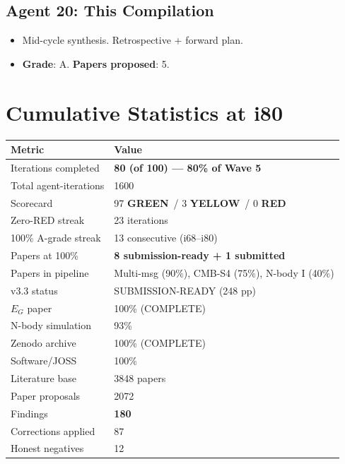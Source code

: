 \documentclass[11pt,a4paper]{article}
\newcommand{\GREEN}{\textcolor{dfdgreen}{\textbf{GREEN}}}
\newcommand{\YELLOW}{\textcolor{dfdyellow}{\textbf{YELLOW}}}
\newcommand{\RED}{\textcolor{dfdred}{\textbf{RED}}}
\begin{document}
\subsection{Agent 20: This Compilation}
\begin{itemize}[nosep]
\item Mid-cycle synthesis. Retrospective + forward plan.
\item \textbf{Grade}: A. \textbf{Papers proposed}: 5.
\end{itemize}

\section{Cumulative Statistics at i80}

\begin{center}
\begin{tabular}{ll}
\toprule
\textbf{Metric} & \textbf{Value} \\
\midrule
Iterations completed & \textbf{80 (of 100) --- 80\% of Wave 5} \\
Total agent-iterations & 1600 \\
Scorecard & 97 \GREEN\ / 3 \YELLOW\ / 0 \RED \\
Zero-RED streak & 23 iterations \\
100\% A-grade streak & 13 consecutive (i68--i80) \\
Papers at 100\% & \textbf{8 submission-ready + 1 submitted} \\
Papers in pipeline & Multi-msg (90\%), CMB-S4 (75\%), N-body I (40\%) \\
v3.3 status & SUBMISSION-READY (248 pp) \\
$E_G$ paper & 100\% (COMPLETE) \\
N-body simulation & 93\% \\
Zenodo archive & 100\% (COMPLETE) \\
Software/JOSS & 100\% \\
Literature base & 3848 papers \\
Paper proposals & 2072 \\
Findings & \textbf{180} \\
Corrections applied & 87 \\
Honest negatives & 12 \\
\bottomrule
\end{tabular}
\end{center}
\end{document}
